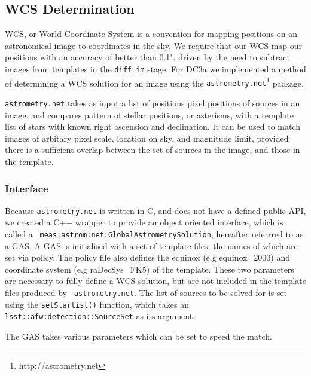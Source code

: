 
\subsection{WCS Determination} \label{sec:wcs}

WCS, or World Coordinate System is a convention for mapping positions
on an astronomical image to coordinates in the sky. We require that
our WCS map our positions with an accuracy of better than 0.1", driven
by the need to subtract images from templates in the {\tt diff\_im}
stage. For DC3a we implemented a method of determining a WCS solution
for an image using the {\tt astrometry.net}\footnote{http://astrometry.net} package.

{\tt astrometry.net} takes as input a list of positions pixel
positions of sources in an image, and compares pattern of stellar
positions, or asterisms, with a template list of stars with known
right ascension and declination. It can be used to match images of
arbitary pixel scale, location on sky, and magnitude limit, provided
there is a sufficient overlap between the set of sources in the image,
and those in the template.

\subsubsection{Interface}
Because {\tt astrometry.net} is written in C, and does not have a
defined public API, we created a C++ wrapper to provide an object
oriented interface, which is called a {\tt
  meas:astrom:net:GlobalAstrometrySolution}, hereafter referrred to as
a GAS. A GAS is initialised with a set of template files, the names of
which are set via policy. The policy file also defines the equinox
(e.g equinox=2000) and coordinate system (e.g raDecSys=FK5) of the
template. These two parameters are necessary to fully define a WCS
solution, but are not included in the template files produced by {\tt
  astrometry.net}. The list of sources to be solved for is set using
the {\tt setStarlist()} function, which takes an {\tt
  lsst::afw:detection::SourceSet} as its argument.


The GAS takes various parameters which can be set to speed the match. 


